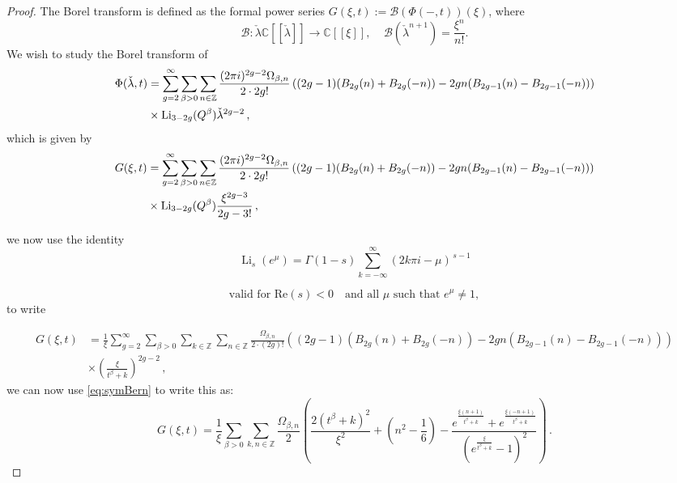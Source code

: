 \documentclass[a4paper,12pt,justification=centering]{article}
\numberwithin{equation}{section}
\newcommand{\ii}{\textnormal{i}}
\theoremstyle{plain}%
\theoremstyle{definition}
\begin{document}
\begin{proof}

The Borel transform is defined as the formal power series $G(\xi,t):=\mathcal{B}(\Phi(-,t))(\xi)$, where
\begin{equation}
    \mathcal{B}\colon\check{\lambda}\mathbb{C}[[\check{\lambda}]]\to \mathbb{C}[[\xi]], \;\;\;\; \mathcal{B}(\check{\lambda}^{n+1})=\frac{\xi^n}{n!}.
\end{equation}
We wish to study the Borel transform of 
\begin{align}
\Phi(\check{\lambda},t)& = \sum_{g=2}^{\infty}\sum_{\beta>0} \sum_{n\in\mathbb{Z}}\frac{(2\pi \ii)^{2g-2} \Omega_{\beta,n}}{2\cdot2g!} \left( (2g-1) (B_{2g}(n)+B_{2g}(-n))- 2g n (B_{2g-1}(n)-B_{2g-1}(-n))\right)\nonumber \\
&\times  \operatorname{Li}_{3-2g}(Q^{\beta}) \check{\lambda}^{2g-2}\,,
\end{align}
which is given by
\begin{align}
G(\xi,t)& = \sum_{g=2}^{\infty}\sum_{\beta>0} \sum_{n\in\mathbb{Z}}\frac{(2\pi \ii)^{2g-2} \Omega_{\beta,n}}{2\cdot2g!} \left( (2g-1) (B_{2g}(n)+B_{2g}(-n))- 2g n (B_{2g-1}(n)-B_{2g-1}(-n))\right)\nonumber \\
&\times  \operatorname{Li}_{3-2g}(Q^{\beta}) \frac{\xi^{2g-3}}{2g-3!}\,,
\end{align}

we now use the identity
$$
\operatorname{Li}_s \left(e^{\mu}\right)
=
\Gamma(1 - s)
\sum_{k=-\infty}^{\infty}
\left(2k\pi i - \mu\right)^{\,s - 1}
$$

$$
\text{valid for } \textrm{Re}(s) < 0 \quad \text{and all } \mu \text{ such that } e^{\mu} \neq 1,
$$
to write

\begin{align}
G(\xi,t)& = \frac{1}{\xi} \sum_{g=2}^{\infty}\sum_{\beta>0} \sum_{k\in \mathbb{Z}}\sum_{n\in\mathbb{Z}} \frac{\Omega_{\beta,n}}{2\cdot (2g)!} \left( (2g-1) (B_{2g}(n)+B_{2g}(-n))- 2g n (B_{2g-1}(n)-B_{2g-1}(-n))\right)\nonumber \\
& \times \left(\frac{\xi}{t^{\beta}+k}\right)^{2g-2}\,,
\end{align}
we can now use \eqref{eq:symBern} to write this as:
\begin{equation}
G(\xi,t)= \frac{1}{\xi} \sum_{\beta>0} \sum_{k,n\in \mathbb{Z}} \frac{\Omega_{\beta, n}}{2}
\left(
  \frac{2(t^{\beta}+k)^2}{\xi^2}
  + \left(n^2 - \frac{1}{6}\right)
  - \frac{
      e^{\frac{\xi(n+1)}{t^{\beta}+k}}
      + e^{\frac{\xi(-n+1)}{t^{\beta}+k}}
    }{
       \left( e^{\frac{\xi}{t^{\beta}+k}} - 1 \right)^2
    } 
\right)\,.
\end{equation}
\end{proof}
\end{document}

